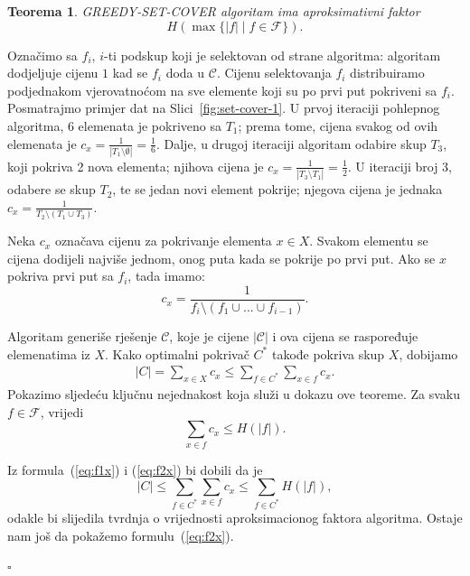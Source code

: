 \documentclass[a4paper, utf8, 11pt, colorlinks]{book}
\newtheorem{thm}{Teorema}
\newenvironment{proof}{{Dokaz:}}{\hfill$\square$}
\begin{document}
\begin{thm}
	  \mbox{GREEDY-SET-COVER} algoritam ima aproksimativni faktor 
	$$ H(\max\{|f| \mid f \in \mathcal{F}\}).$$
	
\end{thm}
\begin{proof}
	  Označimo sa $f_i$, $i$-ti podskup koji je selektovan od strane algoritma: algoritam dodjeljuje cijenu $1$ kad se $f_i$ doda u $\mathcal{C}$. 
	  Cijenu selektovanja $f_i$ distribuiramo podjednakom vjerovatnoćom na sve elemente koji su po prvi put pokriveni sa $f_i$. Posmatrajmo primjer dat na Slici~\ref{fig:set-cover-1}. U prvoj iteraciji pohlepnog algoritma,  
	  6 elemenata je pokriveno sa $T_1$; prema tome, cijena svakog od ovih elemenata je $c_x = \frac{1}{|T_1\setminus \emptyset|}= \frac{1}{6}$. Dalje, u drugoj iteraciji algoritam odabire skup $T_3$, koji pokriva 2 nova elementa; njihova cijena je $c_x=\frac{1}{|T_3 \setminus T_1|} = \frac{1}{2}$. U iteraciji broj 3, odabere se skup $T_2$, te se jedan novi element pokrije; njegova cijena je jednaka $c_x = \frac{1}{T_2 \setminus ( T_1 \cup T_3)}$. 
	 
	 Neka $ c_x$ označava cijenu za pokrivanje elementa $x\in X$.  Svakom elementu se cijena dodijeli najviše jednom, onog puta kada se pokrije po prvi put. Ako se $x$ pokriva prvi put sa $f_i$, tada imamo:
	 $$c_x = \frac{1}{f_i \setminus (f_1 \cup ...\cup f_{i-1})}.$$
	 
	 Algoritam generiše rješenje $\mathcal{C}$, koje je cijene $|\mathcal{C}|$ i ova cijena se raspoređuje elemenatima iz $X$. Kako optimalni pokrivač $C^*$ takođe pokriva skup $X$, dobijamo
	 \begin{align}\label{eq:f1x}
	 	|C| = \sum_{x \in X} c_x \leq \sum_{f \in C^*}\sum_{x \in f} c_x.
	 \end{align}
	  Pokazimo sljedeću ključnu nejednakost koja služi u dokazu ove teoreme. Za svaku $f \in \mathcal{F}$, vrijedi  
	 \begin{equation}\label{eq:f2x}
	 	\sum_{x \in f} c_x \leq H(|f|).
	 \end{equation}
	 
	 Iz formula~(\ref{eq:f1x}) i (\ref{eq:f2x}) bi dobili da je 
	 \begin{equation}
	 	|C| \leq \sum_{f \in C^*}\sum_{x \in f} c_x \leq \sum_{f \in C^*} H(|f|),
	 \end{equation}
	 odakle bi slijedila tvrdnja o vrijednosti aproksimacionog faktora algoritma.
	 Ostaje nam još da pokažemo formulu~(\ref{eq:f2x}). 
	 

\end{proof}
\end{document}
